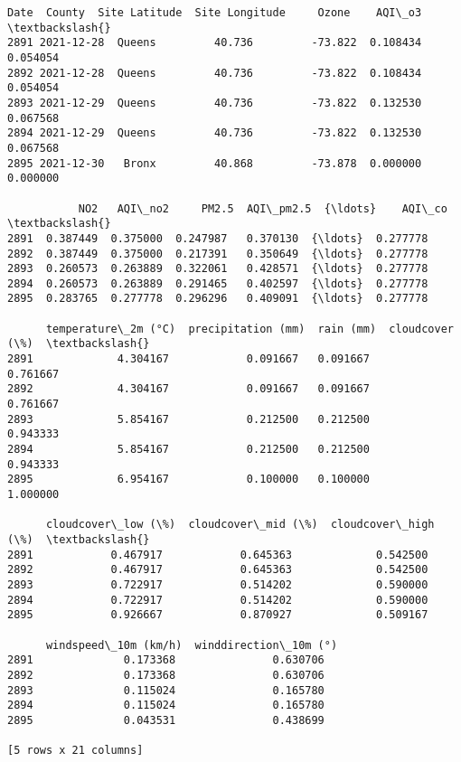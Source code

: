 \documentclass[11pt]{article}
\makeatletter
\newcommand{\boxspacing}{\kern\kvtcb@left@rule\kern\kvtcb@boxsep}
\newcommand{\prompt}[4]{
        {\ttfamily\llap{{\color{#2}[#3]:\hspace{3pt}#4}}\vspace{-\baselineskip}}
    }
\makeatother
\begin{document}
            \begin{tcolorbox}[breakable, size=fbox, boxrule=.5pt, pad at break*=1mm, opacityfill=0]
\prompt{Out}{outcolor}{24}{\boxspacing}
\begin{Verbatim}[commandchars=\\\{\}]
           Date  County  Site Latitude  Site Longitude     Ozone    AQI\_o3  \textbackslash{}
2891 2021-12-28  Queens         40.736         -73.822  0.108434  0.054054
2892 2021-12-28  Queens         40.736         -73.822  0.108434  0.054054
2893 2021-12-29  Queens         40.736         -73.822  0.132530  0.067568
2894 2021-12-29  Queens         40.736         -73.822  0.132530  0.067568
2895 2021-12-30   Bronx         40.868         -73.878  0.000000  0.000000

           NO2   AQI\_no2     PM2.5  AQI\_pm2.5  {\ldots}    AQI\_co  \textbackslash{}
2891  0.387449  0.375000  0.247987   0.370130  {\ldots}  0.277778
2892  0.387449  0.375000  0.217391   0.350649  {\ldots}  0.277778
2893  0.260573  0.263889  0.322061   0.428571  {\ldots}  0.277778
2894  0.260573  0.263889  0.291465   0.402597  {\ldots}  0.277778
2895  0.283765  0.277778  0.296296   0.409091  {\ldots}  0.277778

      temperature\_2m (°C)  precipitation (mm)  rain (mm)  cloudcover (\%)  \textbackslash{}
2891             4.304167            0.091667   0.091667        0.761667
2892             4.304167            0.091667   0.091667        0.761667
2893             5.854167            0.212500   0.212500        0.943333
2894             5.854167            0.212500   0.212500        0.943333
2895             6.954167            0.100000   0.100000        1.000000

      cloudcover\_low (\%)  cloudcover\_mid (\%)  cloudcover\_high (\%)  \textbackslash{}
2891            0.467917            0.645363             0.542500
2892            0.467917            0.645363             0.542500
2893            0.722917            0.514202             0.590000
2894            0.722917            0.514202             0.590000
2895            0.926667            0.870927             0.509167

      windspeed\_10m (km/h)  winddirection\_10m (°)
2891              0.173368               0.630706
2892              0.173368               0.630706
2893              0.115024               0.165780
2894              0.115024               0.165780
2895              0.043531               0.438699

[5 rows x 21 columns]
\end{Verbatim}
\end{tcolorbox}
        
\end{document}

